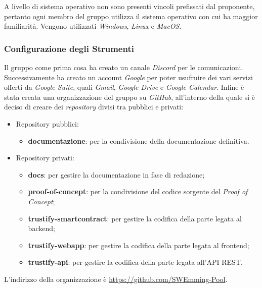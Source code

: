             A livello di sistema operativo non sono presenti vincoli prefissati dal proponente, pertanto ogni membro del gruppo utilizza il sistema operativo con cui ha maggior familiarità.
            Vengono utilizzati \textit{Windows}, \textit{Linux} e \textit{MacOS}.

        \subsubsection{Configurazione degli Strumenti}
            Il gruppo come prima cosa ha creato un canale \textit{Discord} per le comunicazioni.
            Successivamente ha creato un account \textit{Google} per poter usufruire dei vari servizi offerti da \textit{Google Suite}, quali \textit{Gmail}, \textit{Google Drive} e \textit{Google Calendar}.
            Infine è stata creata una organizzazione del gruppo su \textit{GitHub}, all'interno della quale si è deciso di creare dei \textit{repository} divisi tra pubblici e privati:
            \begin{itemize}
                \item Repository pubblici:
                \begin{itemize}
                    \item \textbf{documentazione}: per la condivisione della documentazione definitiva.
                \end{itemize}
                \item Repository privati:
                \begin{itemize}
                    \item \textbf{docs}: per gestire la documentazione in fase di redazione;
                    \item \textbf{proof-of-concept}: per la condivisione del codice sorgente del \textit{Proof of Concept};
                    \item \textbf{trustify-smartcontract}: per gestire la codifica della parte legata al backend;
                    \item \textbf{trustify-webapp}: per gestire la codifica della parte legata al frontend;
                    \item \textbf{trustify-api}: per gestire la codifica della parte legata all'API REST.
                \end{itemize}
            \end{itemize}
            L'indirizzo della organizzazione è \href{https://github.com/SWEmming-Pool}{https://github.com/SWEmming-Pool}.

